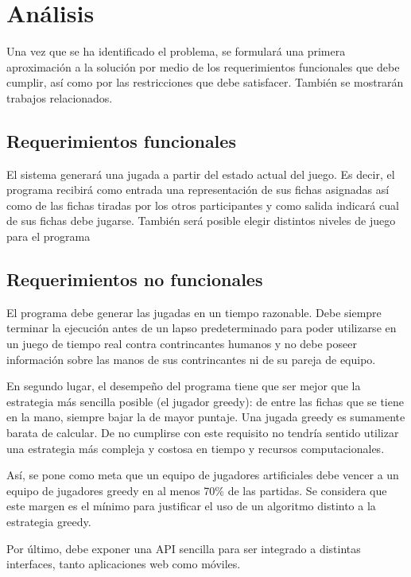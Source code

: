 \chapter{Análisis}

\noindent
Una vez que se ha identificado el problema, se formulará una primera
aproximación a la solución por medio de los requerimientos funcionales que debe
cumplir, así como por las restricciones que debe satisfacer. También se
mostrarán trabajos relacionados.

\newpage

\section{Requerimientos funcionales}

El sistema generará una jugada a partir del estado actual del juego. Es decir,
el programa recibirá como entrada una representación de sus fichas asignadas así
como de las fichas tiradas por los otros participantes y como salida indicará
cual de sus fichas debe jugarse. También será posible elegir distintos niveles
de juego para el programa

\section{Requerimientos no funcionales}

El programa debe generar las jugadas en un tiempo razonable. Debe siempre
terminar la ejecución antes de un lapso predeterminado para poder utilizarse en
un juego de tiempo real contra contrincantes humanos y no debe poseer
información sobre las manos de sus contrincantes ni de su pareja de equipo.

En segundo lugar, el desempeño del programa tiene que ser mejor que la
estrategia más sencilla posible (el jugador greedy): de entre las fichas que se
tiene en la mano, siempre bajar la de mayor puntaje. Una jugada greedy es
sumamente barata de calcular. De no cumplirse con este requisito no tendría
sentido utilizar una estrategia más compleja y costosa en tiempo y recursos
computacionales.

Así, se pone como meta que un equipo de jugadores artificiales debe vencer a un
equipo de jugadores greedy en al menos 70\% de las partidas. Se considera que
este margen es el mínimo para justificar el uso de un algoritmo distinto a la
estrategia greedy.

Por último, debe exponer una API sencilla para ser integrado a distintas
interfaces, tanto aplicaciones web como móviles.

